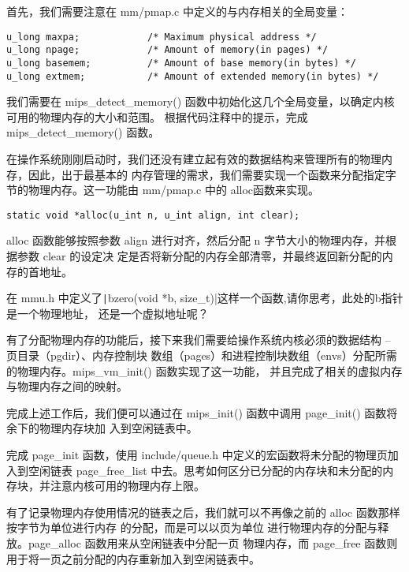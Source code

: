 首先，我们需要注意在 mm/pmap.c 中定义的与内存相关的全局变量：

\begin{verbatim}
u_long maxpa;            /* Maximum physical address */
u_long npage;            /* Amount of memory(in pages) */
u_long basemem;          /* Amount of base memory(in bytes) */
u_long extmem;           /* Amount of extended memory(in bytes) */
\end{verbatim}

\begin{exercise}
我们需要在 mips\_detect\_memory() 函数中初始化这几个全局变量，以确定内核可用的物理内存的大小和范围。
根据代码注释中的提示，完成 mips\_detect\_memory() 函数。
\end{exercise}

在操作系统刚刚启动时，我们还没有建立起有效的数据结构来管理所有的物理内存，因此，出于最基本的
内存管理的需求，我们需要实现一个函数来分配指定字节的物理内存。这一功能由 mm/pmap.c 中的
alloc函数来实现。

\begin{verbatim}
static void *alloc(u_int n, u_int align, int clear);
\end{verbatim}

alloc 函数能够按照参数 align 进行对齐，然后分配 n 字节大小的物理内存，并根据参数 clear 的设定决
定是否将新分配的内存全部清零，并最终返回新分配的内存的首地址。

\begin{thinking}\label{think-bzero}
在 mmu.h 中定义了\texttt|bzero(void *b, size_t)|这样一个函数,请你思考，此处的b指针是一个物理地址，
还是一个虚拟地址呢？
\end{thinking}

有了分配物理内存的功能后，接下来我们需要给操作系统内核必须的数据结构 -- 页目录（pgdir）、内存控制块
数组（pages）和进程控制块数组（envs）分配所需的物理内存。mips\_vm\_init() 函数实现了这一功能，
并且完成了相关的虚拟内存与物理内存之间的映射。

完成上述工作后，我们便可以通过在 mips\_init() 函数中调用 page\_init() 函数将余下的物理内存块加
入到空闲链表中。

\begin{exercise}
完成 page\_init 函数，使用 include/queue.h 中定义的宏函数将未分配的物理页加入到空闲链表
page\_free\_list 中去。思考如何区分已分配的内存块和未分配的内存块，并注意内核可用的物理内存上限。
\end{exercise}

有了记录物理内存使用情况的链表之后，我们就可以不再像之前的 alloc 函数那样按字节为单位进行内存
的分配，而是可以以页为单位 进行物理内存的分配与释放。page\_alloc 函数用来从空闲链表中分配一页
物理内存，而 page\_free 函数则用于将一页之前分配的内存重新加入到空闲链表中。

